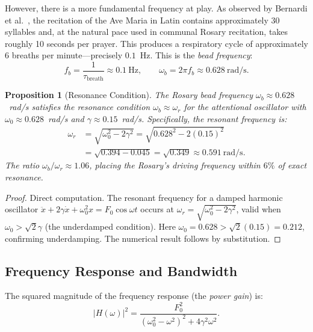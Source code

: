 \documentclass[journal]{IEEEtran}
\newtheorem{proposition}[theorem]{Proposition}
\theoremstyle{definition}
\theoremstyle{remark}
\begin{document}
However, there is a more fundamental frequency at play. As observed by Bernardi et al.~\cite{bernardi2001}, the recitation of the Ave Maria in Latin contains approximately 30 syllables and, at the natural pace used in communal Rosary recitation, takes roughly 10 seconds per prayer. This produces a respiratory cycle of approximately 6 breaths per minute---precisely $0.1$~Hz. This is the \emph{bead frequency}:
\begin{equation}
f_b = \frac{1}{\tau_{\text{breath}}} \approx 0.1~\text{Hz}, \qquad \omega_b = 2\pi f_b \approx 0.628~\text{rad/s}.
\end{equation}

\begin{proposition}[Resonance Condition]\label{prop:resonance}
The Rosary bead frequency $\omega_b \approx 0.628$~rad/s satisfies the resonance condition $\omega_b \approx \omega_r$ for the attentional oscillator with $\omega_0 \approx 0.628$~rad/s and $\gamma \approx 0.15$~rad/s. Specifically, the resonant frequency is:
\begin{align}
\omega_r &= \sqrt{\omega_0^2 - 2\gamma^2} = \sqrt{0.628^2 - 2(0.15)^2} \nonumber\\
&= \sqrt{0.394 - 0.045} = \sqrt{0.349} \approx 0.591~\text{rad/s}.
\end{align}
The ratio $\omega_b / \omega_r \approx 1.06$, placing the Rosary's driving frequency within $6\%$ of exact resonance.
\end{proposition}

\begin{proof}
Direct computation. The resonant frequency for a damped harmonic oscillator $\ddot{x} + 2\gamma\dot{x} + \omega_0^2 x = F_0\cos\omega t$ occurs at $\omega_r = \sqrt{\omega_0^2 - 2\gamma^2}$, valid when $\omega_0 > \sqrt{2}\gamma$ (the underdamped condition). Here $\omega_0 = 0.628 > \sqrt{2}(0.15) = 0.212$, confirming underdamping. The numerical result follows by substitution.
\end{proof}

\subsection{Frequency Response and Bandwidth}\label{sec:bandwidth}

The squared magnitude of the frequency response (the \emph{power gain}) is:
\begin{equation}\label{eq:power_gain}
|H(\omega)|^2 = \frac{F_0^2}{(\omega_0^2 - \omega^2)^2 + 4\gamma^2\omega^2}.
\end{equation}
\end{document}
